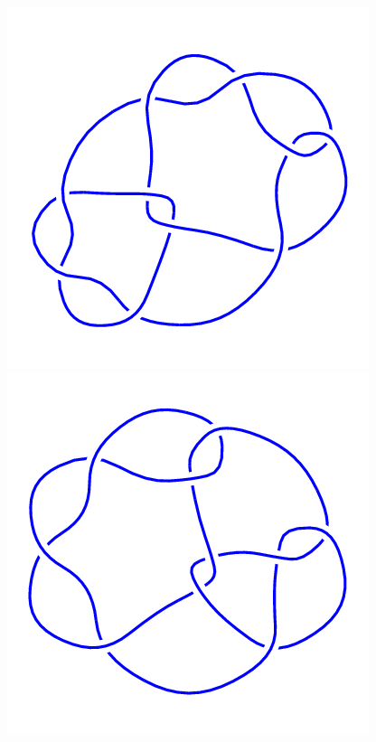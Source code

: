 \begin{figure}[H]
\begin{minipage}[b]{.18\linewidth}
    \end{minipage}
    \begin{minipage}[b]{.18\linewidth}
        \centering
        \includegraphics[width=\linewidth]{../data/10_54.png}
    \end{minipage}
    \begin{minipage}[b]{.18\linewidth}
        \centering
        \includegraphics[width=\linewidth]{../data/10_55.png}

\end{minipage}
\end{figure}
